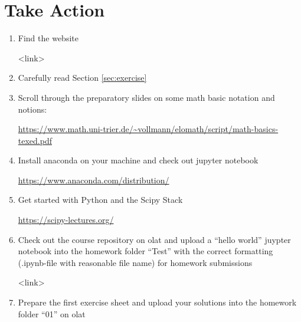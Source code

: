 \documentclass{article}
\def\slides{<link>}
\def\exerciseUploadRep{<link>}
\begin{document}
\section{Take Action}
\begin{enumerate}
	\item Find the website
	\begin{center}
		\slides 
	\end{center} 
%
	\item Carefully read Section \ref{sec:exercise}
%
	\item Scroll through the preparatory slides on some math basic notation and notions: 
	\begin{center} \url{https://www.math.uni-trier.de/~vollmann/elomath/script/math-basics-texed.pdf}\end{center} 
	\item Install anaconda on your machine and check out jupyter notebook
	\begin{center}
		\hyperref{https://www.anaconda.com/distribution/}{}{}{https://www.anaconda.com/distribution/}
	\end{center}
%
	\item Get started with Python and the Scipy Stack
	\begin{center}
		\hyperref{https://scipy-lectures.org/}{}{}{https://scipy-lectures.org/}
	\end{center}
%
	\item Check out the course repository on olat and upload a ``hello world'' juypter notebook into the homework folder ``Test'' with the correct formatting (.ipynb-file with reasonable file name) for homework submissions 
	\begin{center}
		\exerciseUploadRep
	\end{center}
%  
	\item Prepare the first exercise sheet and upload your solutions into the homework folder ``01'' on olat
\end{enumerate}
\newpage
\end{document}
